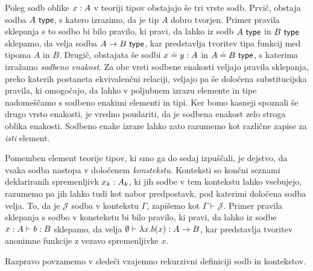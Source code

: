 Poleg sodb oblike \(x : A\) v teoriji tipov obstajajo še tri vrste sodb.
Prvič, obstaja sodba \(A\ \textnormal{\textsf{type}}\), s katero izrazimo, da je tip \(A\) dobro tvorjen.
Primer pravila sklepanja s to sodbo bi bilo
pravilo, ki pravi, da lahko iz sodb \(A\ \textnormal{\textsf{type}}\) in \(B\ \textnormal{\textsf{type}}\) sklepamo, da velja
sodba \(A \to B\ \textnormal{\textsf{type}}\), kar predstavlja tvoritev tipa funkcij med tipoma \(A\) in \(B\).
Drugič, obstajata še sodbi \(x \doteq y : A\) in \(A \doteq B\ \textnormal{\textsf{type}}\),
s katerima izražamo \emph{sodbeno enakost}. Za obe vrsti sodbene enakosti veljajo pravila
sklepanja, preko katerih postaneta ekvivalenčni relaciji,
veljajo pa še določena substitucijska
pravila, ki omogočajo, da lahko v poljubnem izrazu elemente in tipe nadomeščamo s sodbeno
enakimi elementi in tipi. Ker bomo kasneji spoznali še drugo vrsto enakosti, je vredno
poudariti, da je sodbena enakost zelo stroga oblika enakosti. Sodbeno enake izraze lahko
zato razumemo kot različne zapise za \emph{isti} element.

Pomemben element teorije tipov, ki smo ga do sedaj izpuščali, je dejstvo,
da vsaka sodba nastopa v določenem \emph{konstekstu}. Konteksti so končni seznami
deklariranih spremenljivk \(x_k : A_{k}\), ki jih sodbe v tem kontekstu
lahko vsebujejo, razumemo pa jih lahko tudi kot nabor predpostavk, pod katerimi določena
sodba velja.  To, da je \(\mathcal{J}\) sodba v kontekstu \(\Gamma\), zapišemo kot \(\Gamma \vdash \mathcal{J}\).
Primer pravila sklepanja s sodbo v konstekstu bi bilo pravilo, ki pravi,
da lahko iz sodbe
\(x : A \vdash b : B\) sklepamo, da velja
\(\emptyset \vdash \lambda x.b(x) : A \to B\), kar predstavlja tvoritev
anonimne funkcije z vezavo spremenljivke \(x\).

Razpravo povzamemo v sledeči vzajemno rekurzivni definiciji sodb in kontekstov.

